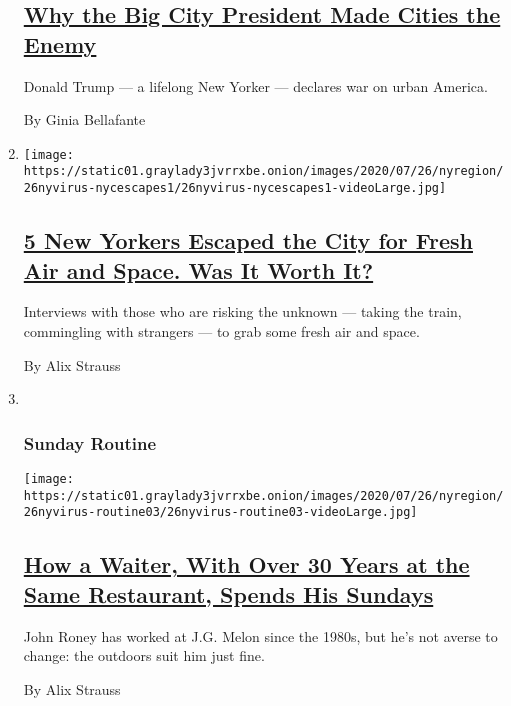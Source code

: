 \begin{enumerate}
  \hypertarget{why-the-big-city-president-made-cities-the-enemy}{%
  \subsection{\texorpdfstring{\href{/2020/07/24/nyregion/trump-cities.html}{Why
  the Big City President Made Cities the
  Enemy}}{Why the Big City President Made Cities the Enemy}}\label{why-the-big-city-president-made-cities-the-enemy}}

  Donald Trump --- a lifelong New Yorker --- declares war on urban
  America.

  By Ginia Bellafante
\item
  \texttt{[image: https://static01.graylady3jvrrxbe.onion/images/2020/07/26/nyregion/26nyvirus-nycescapes1/26nyvirus-nycescapes1-videoLarge.jpg]}

  \hypertarget{5-new-yorkers-escaped-the-city-for-fresh-air-and-space-was-it-worth-it}{%
  \subsection{\texorpdfstring{\href{/2020/07/24/nyregion/coronavirus-quick-escapes-nyc.html}{5
  New Yorkers Escaped the City for Fresh Air and Space. Was It Worth
  It?}}{5 New Yorkers Escaped the City for Fresh Air and Space. Was It Worth It?}}\label{5-new-yorkers-escaped-the-city-for-fresh-air-and-space-was-it-worth-it}}

  Interviews with those who are risking the unknown --- taking the
  train, commingling with strangers --- to grab some fresh air and
  space.

  By Alix Strauss
\item ~
  \hypertarget{sunday-routine}{%
  \subsubsection{Sunday Routine}\label{sunday-routine}}

  \texttt{[image: https://static01.graylady3jvrrxbe.onion/images/2020/07/26/nyregion/26nyvirus-routine03/26nyvirus-routine03-videoLarge.jpg]}

  \hypertarget{how-a-waiter-with-over-30-years-at-the-same-restaurant-spends-his-sundays}{%
  \subsection{\texorpdfstring{\href{/2020/07/24/nyregion/coronavirus-JG-Melon-waiter-nyc.html}{How
  a Waiter, With Over 30 Years at the Same Restaurant, Spends His
  Sundays}}{How a Waiter, With Over 30 Years at the Same Restaurant, Spends His Sundays}}\label{how-a-waiter-with-over-30-years-at-the-same-restaurant-spends-his-sundays}}

  John Roney has worked at J.G. Melon since the 1980s, but he's not
  averse to change: the outdoors suit him just fine.

  By Alix Strauss
\end{enumerate}

